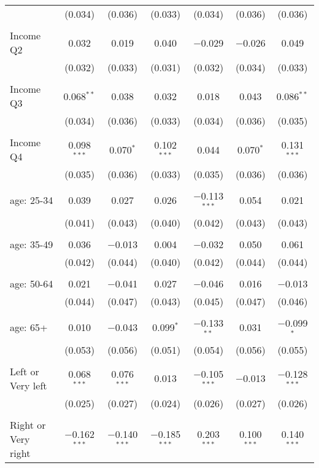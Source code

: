 \begin{tabular}{@{\extracolsep{5pt}}lcccccc}
  & (0.034) & (0.036) & (0.033) & (0.034) & (0.036) & (0.036) \\ 
  & & & & & & \\ 
 Income Q2 & 0.032 & 0.019 & 0.040 & $-$0.029 & $-$0.026 & 0.049 \\ 
  & (0.032) & (0.033) & (0.031) & (0.032) & (0.034) & (0.033) \\ 
  & & & & & & \\ 
 Income Q3 & 0.068$^{**}$ & 0.038 & 0.032 & 0.018 & 0.043 & 0.086$^{**}$ \\ 
  & (0.034) & (0.036) & (0.033) & (0.034) & (0.036) & (0.035) \\ 
  & & & & & & \\ 
 Income Q4 & 0.098$^{***}$ & 0.070$^{*}$ & 0.102$^{***}$ & 0.044 & 0.070$^{*}$ & 0.131$^{***}$ \\ 
  & (0.035) & (0.036) & (0.033) & (0.035) & (0.036) & (0.036) \\ 
  & & & & & & \\ 
 age: 25-34 & 0.039 & 0.027 & 0.026 & $-$0.113$^{***}$ & 0.054 & 0.021 \\ 
  & (0.041) & (0.043) & (0.040) & (0.042) & (0.043) & (0.043) \\ 
  & & & & & & \\ 
 age: 35-49 & 0.036 & $-$0.013 & 0.004 & $-$0.032 & 0.050 & 0.061 \\ 
  & (0.042) & (0.044) & (0.040) & (0.042) & (0.044) & (0.044) \\ 
  & & & & & & \\ 
 age: 50-64 & 0.021 & $-$0.041 & 0.027 & $-$0.046 & 0.016 & $-$0.013 \\ 
  & (0.044) & (0.047) & (0.043) & (0.045) & (0.047) & (0.046) \\ 
  & & & & & & \\ 
 age: 65+ & 0.010 & $-$0.043 & 0.099$^{*}$ & $-$0.133$^{**}$ & 0.031 & $-$0.099$^{*}$ \\ 
  & (0.053) & (0.056) & (0.051) & (0.054) & (0.056) & (0.055) \\ 
  & & & & & & \\ 
 Left or Very left & 0.068$^{***}$ & 0.076$^{***}$ & 0.013 & $-$0.105$^{***}$ & $-$0.013 & $-$0.128$^{***}$ \\ 
  & (0.025) & (0.027) & (0.024) & (0.026) & (0.027) & (0.026) \\ 
  & & & & & & \\ 
 Right or Very right & $-$0.162$^{***}$ & $-$0.140$^{***}$ & $-$0.185$^{***}$ & 0.203$^{***}$ & 0.100$^{***}$ & 0.140$^{***}$ \\ 

\end{tabular}
